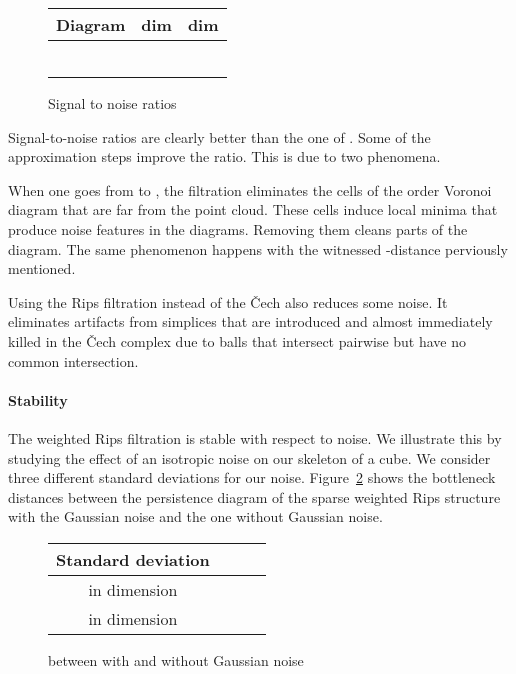 \documentclass[a4paper]{article}
\begin{document}
\begin{figure}[!ht]
\centering
\begin{tabular}{|c|c|c|}
\hline
Diagram & dim  & dim  \\
\hline
 &  &  \\
 &  &   \\
 &  &  \\
 &  &  \\
 &  &  \\
 &  &  \\
\hline
\end{tabular}
\caption{Signal to noise ratios}\label{fRatio}
\end{figure}

Signal-to-noise ratios are clearly better than the one of .
Some of the approximation steps improve the ratio.
This is due to two phenomena.

When one goes from  to , the filtration eliminates the cells of the  order Voronoi diagram that are far from the point cloud.
These cells induce local minima that produce noise features in the diagrams.
Removing them cleans parts of the diagram.
The same phenomenon happens with the witnessed -distance perviously mentioned.

Using the Rips filtration instead of the \v{C}ech also reduces some noise.
It eliminates artifacts from simplices that are introduced and almost immediately killed in the \v{C}ech complex due to balls that intersect pairwise but have no common intersection.

\paragraph{Stability\\}

The weighted Rips filtration is stable with respect to noise. 
We illustrate this by studying the effect of an isotropic noise on our skeleton of a cube. 
We consider three different standard deviations for our noise.
Figure~\ref{fGauss} shows the bottleneck distances between the persistence diagram of the sparse weighted Rips structure with the Gaussian noise and the one without Gaussian noise.

\begin{figure}[!ht]
\centering
\begin{tabular}{|c|c|c|c|}
\hline
Standard deviation &  &  &  \\
\hline
 in dimension  &  &  &  \\
 in dimension  &  &  &  \\
\hline
\end{tabular}
\caption{ between  with and without Gaussian noise}\label{fGauss}
\end{figure}
\end{document}
